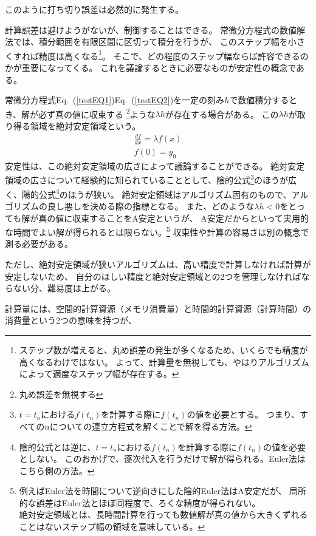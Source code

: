 \documentclass[autodetect-engine,dvipdfmx-if-dvi,ja=standard,a4paper,layout=v2]{bxjsreport}
\newcommand{\eref}[1]{Eq.~(\ref{#1})}
\begin{document}
    このように打ち切り誤差は必然的に発生する。\par
    計算誤差は避けようがないが、制御することはできる。
    常微分方程式の数値解法では、積分範囲を有限区間に区切って積分を行うが、
    このステップ幅を小さくすれば精度は高くなる\footnote{
      ステップ数が増えると、丸め誤差の発生が多くなるため、いくらでも精度が高くなるわけではない。
      よって、計算量を無視しても、やはりアルゴリズムによって適度なステップ幅が存在する。
    }。
    そこで、どの程度のステップ幅ならば許容できるのかが重要になってくる。
    これを議論するときに必要なものが安定性の概念である。\par
    常微分方程式\eref{testEQ1}\eref{testEQ2}を一定の刻み$h$で数値積分するとき、解が必ず真の値に収束する
    \footnote{丸め誤差を無視する}ような$\lambda h$が存在する場合がある。
    この$\lambda h$が取り得る領域を絶対安定領域という。
    \begin{align}
      \frac{df}{dx}= \lambda f(x)\label{testEQ1}\\
      f(0) = y_0\label{testEQ2}
    \end{align}
    安定性は、この絶対安定領域の広さによって議論することができる。
    絶対安定領域の広さについて経験的に知られていることとして、陰的公式\footnote{
      $t=t_n$における$f(t_n)$を計算する際に$f(t_n)$の値を必要とする。
      つまり、すべての$n$についての連立方程式を解くことで解を得る方法。
    }のほうが広く、陽的公式\footnote{
      陰的公式とは逆に、$t=t_n$における$f(t_n)$を計算する際に$f(t_n)$の値を必要としない。
      このおかげで、逐次代入を行うだけで解が得られる。Euler法はこちら側の方法。
    }のほうが狭い。
    絶対安定領域はアルゴリズム固有のもので、アルゴリズムの良し悪しを決める際の指標となる。
    また、どのような$\lambda h<0$をとっても解が真の値に収束することをA安定というが、
    A安定だからといって実用的な時間でよい解が得られるとは限らない。\footnote{
      例えばEuler法を時間について逆向きにした陰的Euler法はA安定だが、
      局所的な誤差はEuler法とほぼ同程度で、ろくな精度が得られない。\\
      絶対安定領域とは、長時間計算を行っても数値解が真の値から大きくずれることはないステップ幅の領域を意味している。
    }
    収束性や計算の容易さは別の概念で測る必要がある。\par
    ただし、絶対安定領域が狭いアルゴリズムは、高い精度で計算しなければ計算が安定しないため、
    自分のほしい精度と絶対安定領域との2つを管理しなければならない分、難易度は上がる。\par
    計算量には、空間的計算資源（メモリ消費量）と時間的計算資源（計算時間）の消費量という2つの意味を持つが、
\end{document}
